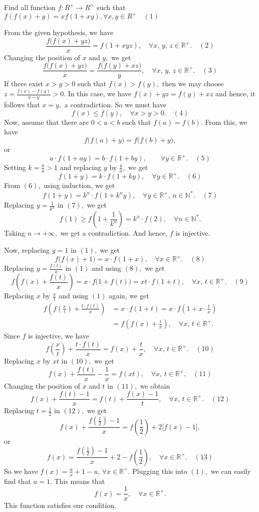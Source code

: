 \begin{solution}
	\begin{tcolorbox}Find all function $f:R^+\rightarrow R^+$  such that
$f(f(x)+y)=xf(1+xy),\forall x,y\in R^+\quad (1)$\end{tcolorbox}
From the given hypothesis, we have \[\frac{f\big(f(x)+yz\big)}{x}=f(1+xyz),\quad \forall x,\,y,\,z \in \mathbb R^+.\quad (2)\] Changing the position of $x$ and $y,$ we get \[\frac{f\big(f(x)+yz\big)}{x}=\frac{f\big(f(y)+xz\big)}{y},\quad \forall x,\,y,\,z \in \mathbb R^+. \quad (3)\] If there exist $x>y>0$ such that $f(x)>f(y),$ then we may choose $z=\frac{f(x)-f(y)}{x-y}>0.$ In this case, we have $f(x)+yz=f(y)+xz$ and hence, it follows that $x=y,$ a contradiction. So we must have \[f(x) \le f(y), \quad \forall x>y>0. \quad (4)\] Now, assume that there are $0<a<b$ such that $f(a)=f(b).$ From this, we have \[f\big(f(a)+y\big)=f\big(f(b)+y\big),\] or \[a\cdot f(1+ay)=b\cdot f(1+by),\quad \quad \forall y\in \mathbb R^+. \quad (5)\] Setting $k=\frac{b}{a}>1$ and replacing $y$ by $\frac{y}{a},$ we get \[f(1+y)=k\cdot f(1+ky),\quad \forall y\in\mathbb R^+. \quad (6)\] From $(6),$ using induction, we get \[f(1+y)=k^n\cdot f(1+k^ny),\quad \forall y\in \mathbb R^+,\, n \in \mathbb N^*.\quad (7)\] Replacing $y=\frac{1}{k^n}$ in $(7),$ we get \[f(1) \ge f\left( 1+\frac{1}{k^n}\right) =k^n\cdot f(2),\quad \forall n \in \mathbb N^*.\] Taking $n \to +\infty,$ we get a contradiction. And hence, $f$ is injective.

Now, replacing $y=1$ in $(1),$ we get \[f\big(f(x)+1\big)=x\cdot f(1+x),\quad \forall x\in \mathbb R^+. \quad (8)\] Replacing $y=\frac{f(t)}{x}$ in $(1)$ and using $(8),$ we get \[f\left(f(x)+\frac{f(t)}{x}\right)=x\cdot f\big(1+f(t)\big)=xt\cdot f(1+t),\quad \forall x,\, t \in \mathbb R^+. \quad (9)\] Replacing $x$ by $\frac{x}{t}$ and using $(1)$ again, we get \[\begin{aligned} f\left(f\left(\frac{x}{t}\right)+\frac{t\cdot f(t)}{x}\right) &=x\cdot f(1+t)=x\cdot f\left(1+x\cdot \frac{t}{x}\right) \\ &=f\left(f(x)+\frac{t}{x}\right),\quad \forall x,\, t \in \mathbb R^+.\end{aligned}\] Since $f$ is injective, we have \[f\left(\frac{x}{t}\right)+\frac{t\cdot f(t)}{x}=f(x)+\frac{t}{x},\quad \forall x,\,t \in \mathbb R^+. \quad (10)\] Replacing $x$ by $xt$ in $(10),$ we get \[f(x)+\frac{f(t)}{x}-\frac{1}{x}=f(xt),\quad \forall x,\,t \in \mathbb R^+.\quad (11)\] Changing the position of $x$ and $t$ in $(11),$ we obtain \[f(x)+\frac{f(t)-1}{x}=f(t)+\frac{f(x)-1}{t},\quad \forall x,\,t \in \mathbb R^+. \quad (12)\] Replacing $t=\frac{1}{2}$ in $(12),$ we get \[f(x)+\frac{f\left( \frac{1}{2}\right)-1}{x}=f\left(\frac{1}{2}\right)+2\big[ f(x)-1\big],\] or \[f(x)=\frac{f\left(\frac{1}{2}\right)-1}{x}+2-f\left( \frac{1}{2}\right),\quad \forall x \in \mathbb R^+. \quad (13)\] So we have $f(x)=\frac{u}{x}+1-u,\, \forall x \in \mathbb R^+.$ Plugging this into $(1),$ we can easily find that $u=1.$ This means that \[f(x)=\frac{1}{x},\quad \forall x \in \mathbb R^+.\] This function satisfies our condition.


\end{solution}
